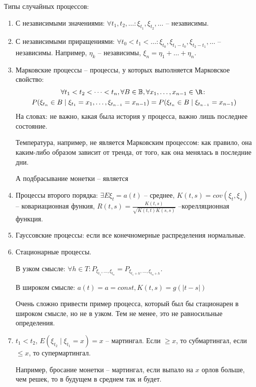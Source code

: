 Типы случайных процессов:
\begin{enumerate}
\item С независимыми значениями: $\forall t_1, t_2, \dots \colon \xi_{t_1}, \xi_{t_2}, \dots$ -- независимы.

\item С независимыми приращениями: $\forall t_0 < t_1 < \dots \colon \xi_{t_0}, \xi_{t_1 - t_0}, \xi_{t_2 - t_1}, \dots$ -- независимы.
Например, $\eta_k$ -- независимы, $\xi_n = \eta_1 + \dots + \eta_n$.

\item Марковские процессы -- процессы, у которых выполняется Марковское свойство: 
    \begin{gather*}
        \forall t_1 < t_2 < \dots < t_n, \forall B \in \mathbb{B}, \forall x_1, \dots, x_{n-1} \in \R \colon \\
        P(\xi_{t_n} \in B \mid \xi_{t_1} = x_1, \dots, \xi_{t_{n-1}} = x_{n-1}) = P(\xi_{t_n} \in B \mid \xi_{t_{n-1}} = x_{n-1})
    \end{gather*}
На словах: не важно, какая была история у процесса, важно лишь последнее состояние.
\begin{exmp}
Температура, например, не является Марковским процессом: как правило, она каким-либо образом зависит от тренда, от того, как она менялась в последние дни.
\end{exmp}                                                                                                                                                                                 
\begin{exmp}
А подбрасывание монетки -- является
\end{exmp}
\item Процессы второго порядка: $\exists E \xi_t = a(t)$ -- среднее, $K(t, s) = cov(\xi_t, \xi_s)$ -- ковариационная функия, $R(t, s) = \frac{K(t, s)}{\sqrt{K(t, t)K(s, s)}}$ --корелляционная функция.

\item Гауссовские процессы: если все конечномерные распределения нормальные.

\item Стационарные процессы. 

В узком смысле: $\forall h \in T\colon P_{\xi_{t_1}, \dots, \xi_{t_n}} = P_{\xi_{t_1 + h}, \dots, \xi_{t_n + h}}$.

В широком смысле: $a(t) = a = const, K(t, s) = g(|t - s|)$
\begin{Rem}
Очень сложно привести пример процесса, который был бы стационарен в широком смысле, но не в узком.
Тем не менее, это не равносильные определения.
\end{Rem}

\item $t_1 < t_2$, $E(\xi_{t_2} \mid \xi_{t_1} = x) = x$ -- мартингал. Если $\geq x$, то субмартингал, если $\leq x$, то супермартингал.
\begin{exmp}
Например, бросание монетки -- мартингал, если выпало на $x$ орлов больше, чем решек, то в будущем в среднем так и будет.
\end{exmp}

\end{enumerate}

